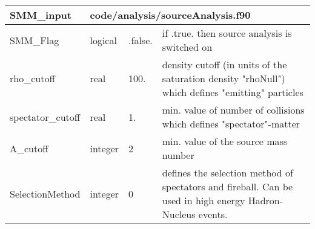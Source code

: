 \documentclass{article}
\begin{document}

\begin{longtable}{llll}
\toprule
\textbf{\large{SMM\_input}} & \multicolumn{3}{l}{\footnotesize{code/analysis/sourceAnalysis.f90}}\\*
\midrule
\endfirsthead
\midrule
\endhead
SMM\_Flag & \begin{minipage}[t]{2cm}logical\end{minipage} & \begin{minipage}[t]{2cm}.false.\end{minipage} & \begin{minipage}[t]{12cm}if .true. then source analysis is switched on\end{minipage}\\*
\midrule
rho\_cutoff & \begin{minipage}[t]{2cm}real\end{minipage} & \begin{minipage}[t]{2cm}100.\end{minipage} & \begin{minipage}[t]{12cm}density cutoff (in units of the saturation density "rhoNull") which defines "emitting" particles\end{minipage}\\*
\midrule
spectator\_cutoff & \begin{minipage}[t]{2cm}real\end{minipage} & \begin{minipage}[t]{2cm}1.\end{minipage} & \begin{minipage}[t]{12cm}min. value of number of collisions which defines "spectator"-matter\end{minipage}\\*
\midrule
A\_cutoff & \begin{minipage}[t]{2cm}integer\end{minipage} & \begin{minipage}[t]{2cm}2\end{minipage} & \begin{minipage}[t]{12cm}min. value of the source mass number\end{minipage}\\*
\midrule
SelectionMethod & \begin{minipage}[t]{2cm}integer\end{minipage} & \begin{minipage}[t]{2cm}0\end{minipage} & \begin{minipage}[t]{12cm}defines the selection method of spectators and fireball. Can be used in high energy Hadron-Nucleus events.\end{minipage}\\*

\end{longtable}
\end{document}
